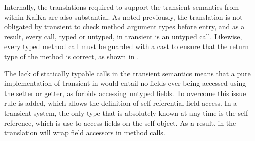 \documentclass[a4paper,USenglish]{tex/lipics-v2016}
\begin{document}
\begin{mathpar}

\end{mathpar}

Internally, the translations required to support the transient semantics from within KafKa are also substantial. 
As noted previously, the translation is not obligated by transient to check method argument types before entry, and as a result, every call, 
typed or untyped, in transient is an untyped call. Likewise, every typed method call must be guarded with a cast to ensure that 
the return type of the method is correct, as shown in .
 

\begin{mathpar}





\end{mathpar}

The lack of statically typable calls in the transient semantics means that a pure implementation of transient in 
\kafka would entail no fields ever being accessed using the setter or getter, as \kafka forbids accessing untyped fields.
To overcome this issue rule  is added, which allows the definition of self-referential field access. In a transient 
system, the only type that is absolutely known at any time is the self-reference, which is use to access fields on the 
self object. As a result, in \kafka the translation will wrap field accessors in method calls.
\end{document}
